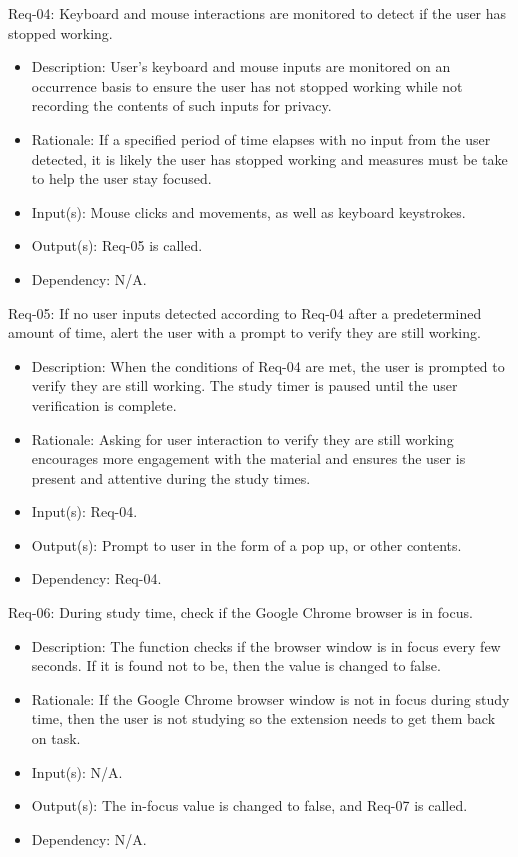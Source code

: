 \documentclass[12pt]{article}
\begin{document}
Req-04: Keyboard and mouse interactions are monitored to detect if the user has stopped working.
\begin{itemize}
    \item Description: User's keyboard and mouse inputs are monitored on an occurrence basis to ensure the user has not stopped working while not recording the contents of such inputs for privacy.
    \item Rationale: If a specified period of time elapses with no input from the user detected, it is likely the user has stopped working and measures must be take to help the user stay focused.
    \item Input(s): Mouse clicks and movements, as well as keyboard keystrokes.
    \item Output(s): Req-05 is called.
    \item Dependency: N/A.
\end{itemize}
Req-05: If no user inputs detected according to Req-04 after a predetermined amount of time, alert the user with a prompt to verify they are still working.
\begin{itemize}
    \item Description: When the conditions of Req-04 are met, the user is prompted to verify they are still working. The study timer is paused until the user verification is complete.
    \item Rationale: Asking for user interaction to verify they are still working encourages more engagement with the material and ensures the user is present and attentive during the study times.
    \item Input(s): Req-04.
    \item Output(s): Prompt to user in the form of a pop up, or other contents.
    \item Dependency: Req-04.
\end{itemize}
Req-06: During study time, check if the Google Chrome browser is in focus.
\begin{itemize}
    \item Description: The function checks if the browser window is in focus every few seconds. If it is found not to be, then the value is changed to false.
    \item Rationale: If the Google Chrome browser window is not in focus during study time, then the user is not studying so the extension needs to get them back on task.
    \item Input(s): N/A.
    \item Output(s): The in-focus value is changed to false, and Req-07 is called.
    \item Dependency: N/A.
\end{itemize}
\end{document}
